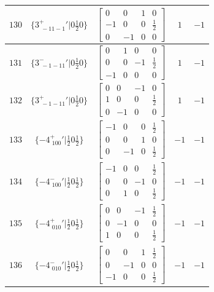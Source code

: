 \documentclass[fleqn,8pt]{jsarticle}
\begin{document}
\begin{longtable}{ccccc}
$ 130 $ & $ \{3^{+}_{\,\,-11-1}{}'|0 \frac{1}{2} 0\} $ & $ \begin{bmatrix} 0 & 0 & 1 & 0 \\ -1 & 0 & 0 & \frac{1}{2} \\ 0 & -1 & 0 & 0 \end{bmatrix} $ & $ 1 $ & $ -1 $ \\ \hline
$ 131 $ & $ \{3^{-}_{\,\,-1-11}{}'|0 \frac{1}{2} 0\} $ & $ \begin{bmatrix} 0 & 1 & 0 & 0 \\ 0 & 0 & -1 & \frac{1}{2} \\ -1 & 0 & 0 & 0 \end{bmatrix} $ & $ 1 $ & $ -1 $ \\ \hline
$ 132 $ & $ \{3^{+}_{\,\,-1-11}{}'|0 \frac{1}{2} 0\} $ & $ \begin{bmatrix} 0 & 0 & -1 & 0 \\ 1 & 0 & 0 & \frac{1}{2} \\ 0 & -1 & 0 & 0 \end{bmatrix} $ & $ 1 $ & $ -1 $ \\ \hline
$ 133 $ & $ \{-4^{+}_{\,\,100}{}'|\frac{1}{2} 0 \frac{1}{2}\} $ & $ \begin{bmatrix} -1 & 0 & 0 & \frac{1}{2} \\ 0 & 0 & 1 & 0 \\ 0 & -1 & 0 & \frac{1}{2} \end{bmatrix} $ & $ -1 $ & $ -1 $ \\ \hline
$ 134 $ & $ \{-4^{-}_{\,\,100}{}'|\frac{1}{2} 0 \frac{1}{2}\} $ & $ \begin{bmatrix} -1 & 0 & 0 & \frac{1}{2} \\ 0 & 0 & -1 & 0 \\ 0 & 1 & 0 & \frac{1}{2} \end{bmatrix} $ & $ -1 $ & $ -1 $ \\ \hline
$ 135 $ & $ \{-4^{+}_{\,\,010}{}'|\frac{1}{2} 0 \frac{1}{2}\} $ & $ \begin{bmatrix} 0 & 0 & -1 & \frac{1}{2} \\ 0 & -1 & 0 & 0 \\ 1 & 0 & 0 & \frac{1}{2} \end{bmatrix} $ & $ -1 $ & $ -1 $ \\ \hline
$ 136 $ & $ \{-4^{-}_{\,\,010}{}'|\frac{1}{2} 0 \frac{1}{2}\} $ & $ \begin{bmatrix} 0 & 0 & 1 & \frac{1}{2} \\ 0 & -1 & 0 & 0 \\ -1 & 0 & 0 & \frac{1}{2} \end{bmatrix} $ & $ -1 $ & $ -1 $ \\ \hline

\end{longtable}
\end{document}
